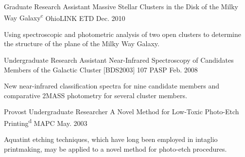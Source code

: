 \begin{cventries}
  \cventry
    {Graduate Research Assistant} %
    {Massive Stellar Clusters in the Disk of the Milky Way Galaxy\textsuperscript{c}} %
    {OhioLINK ETD} %
    {Dec. 2010} %
    {
      \begin{cvcompactparagraph}
        Using spectroscopic and photometric analysis of two open clusters to determine the structure of the plane of the Milky Way Galaxy.
      \end{cvcompactparagraph}
    }

  \cventry
    {Undergraduate Research Assistant} %
    {Near-Infrared Spectroscopy of Candidates Members of the Galactic Cluster [BDS2003] 107} %
    {PASP} %
    {Feb. 2008} %
    {
      \begin{cvcompactparagraph}
        New near-infrared classification spectra for nine candidate members and comparative 2MASS photometry for several cluster members.
      \end{cvcompactparagraph}
    }

  \cventry
    {Provost Undergraduate Researcher} %
    {A Novel Method for Low-Toxic Photo-Etch Printing\textsuperscript{d}} %
    {MAPC} %
    {May. 2003} %
    {
      \begin{cvcompactparagraph}
        Aquatint etching techniques, which have long been employed in intaglio printmaking, may be applied to a novel method for photo-etch procedures.
      \end{cvcompactparagraph}
    }

\end{cventries}
